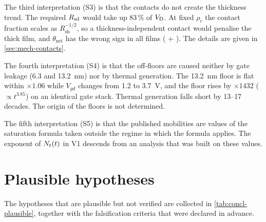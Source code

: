 The third interpretation (S3) is that the contacts do not create the thickness trend. The required $R_{\mathrm{sd}}$ would take up 83\,\% of $V_{\mathrm{D}}$. At fixed $\rho_c$ the contact fraction scales as $R_{\mathrm{sh}}^{-1/2}$, so a thickness-independent contact would penalise the thick film, and $\theta_{\mathrm{net}}$ has the wrong sign in all films (\evCORR{} + \evLIT). The details are given in \cref{sec:mech-contacts}.

The fourth interpretation (S4) is that the off-floors are caused neither by gate leakage (6.3 and 13.2~nm) nor by thermal generation. The 13.2~nm floor is flat within $\times1.06$ while $V_{gd}$ changes from 1.2 to 3.7~V, and the floor rises by $\times1432$ ($\propto t^{3.85}$) on an identical gate stack. Thermal generation falls short by 13--17 decades. The origin of the floors is not determined.

The fifth interpretation (S5) is that the published mobilities are values of the saturation formula taken outside the regime in which the formula applies. The exponent of $N_{\mathrm{t}}(t)$ in V1 descends from an analysis that was built on these values.

\section{Plausible hypotheses}\label{sec:concl-plausible}

The hypotheses that are plausible but not verified are collected in \cref{tab:concl-plausible}, together with the falsification criteria that were declared in advance.

